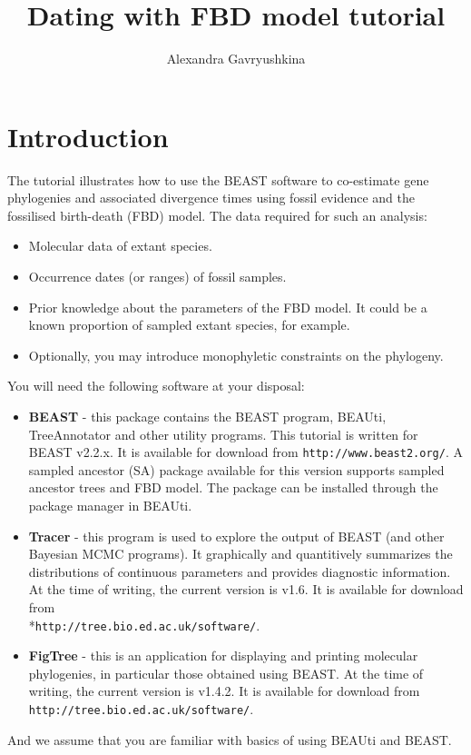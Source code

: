\documentclass[12pt]{article}
\title{Dating with FBD model tutorial}
\author{Alexandra Gavryushkina}
\date{}
\newcommand{\BEASTVersion}{2.2.x}
\newcommand{\TracerVersion}{1.6}
\newcommand{\FigTreeVersion}{1.4.2}
\begin{document}
\maketitle


\section{Introduction}

The tutorial illustrates how to use the BEAST software to co-estimate gene phylogenies and associated divergence times using fossil evidence and the fossilised birth-death (FBD) model. 
The data required for such an analysis:

\begin{itemize}

\item Molecular data of extant species. 

\item Occurrence dates (or ranges) of fossil samples.

\item Prior knowledge about the parameters of the FBD model. It could be a known proportion of sampled extant species, for example.

\item Optionally, you may introduce monophyletic constraints on the phylogeny. 

\end{itemize}

You will need the following software at your disposal: 

\begin{itemize}

\item {\bf BEAST} - this package contains the BEAST program, BEAUti, TreeAnnotator and other utility programs. This tutorial is written for BEAST v{\BEASTVersion}. It is available for download from \texttt{http://www.beast2.org/}.  A sampled ancestor (SA) package available for this version supports sampled ancestor trees and FBD model. The package can be installed through the package manager in BEAUti.  
\item {\bf Tracer} - this program is used to explore the output of BEAST (and other Bayesian MCMC programs). It graphically and
quantitively summarizes the distributions of continuous parameters and provides diagnostic information. At the time of
writing, the current version is v{\TracerVersion}. It is available for download from\\*\texttt{http://tree.bio.ed.ac.uk/software/}.
\item {\bf FigTree} - this is an application for displaying and printing molecular phylogenies, in particular those obtained using
BEAST. At the time of writing, the current version is v{\FigTreeVersion}. It is available for download from \texttt{http://tree.bio.ed.ac.uk/software/}.
\end{itemize}
And we assume that you are familiar with basics of using BEAUti and BEAST. 
\end{document}
